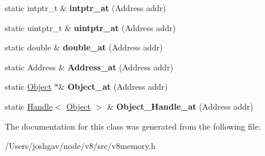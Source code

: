 \begin{DoxyCompactItemize}
\item 
static intptr\+\_\+t \& {\bfseries intptr\+\_\+at} (Address addr)\hypertarget{classv8_1_1internal_1_1_memory_ac630a62dd8be6165db3ada9770397953}{}\label{classv8_1_1internal_1_1_memory_ac630a62dd8be6165db3ada9770397953}

\item 
static uintptr\+\_\+t \& {\bfseries uintptr\+\_\+at} (Address addr)\hypertarget{classv8_1_1internal_1_1_memory_ae19c9eb8301d712ea2706f5e351d18f9}{}\label{classv8_1_1internal_1_1_memory_ae19c9eb8301d712ea2706f5e351d18f9}

\item 
static double \& {\bfseries double\+\_\+at} (Address addr)\hypertarget{classv8_1_1internal_1_1_memory_ae6df6e6ff180d5ca8d3b1e03c528a5a4}{}\label{classv8_1_1internal_1_1_memory_ae6df6e6ff180d5ca8d3b1e03c528a5a4}

\item 
static Address \& {\bfseries Address\+\_\+at} (Address addr)\hypertarget{classv8_1_1internal_1_1_memory_a4e3a386530c273fb87e684a6cfd65c19}{}\label{classv8_1_1internal_1_1_memory_a4e3a386530c273fb87e684a6cfd65c19}

\item 
static \hyperlink{classv8_1_1internal_1_1_object}{Object} $\ast$\& {\bfseries Object\+\_\+at} (Address addr)\hypertarget{classv8_1_1internal_1_1_memory_a44b9d30b0f35df05e29aca423839b4f5}{}\label{classv8_1_1internal_1_1_memory_a44b9d30b0f35df05e29aca423839b4f5}

\item 
static \hyperlink{classv8_1_1internal_1_1_handle}{Handle}$<$ \hyperlink{classv8_1_1internal_1_1_object}{Object} $>$ \& {\bfseries Object\+\_\+\+Handle\+\_\+at} (Address addr)\hypertarget{classv8_1_1internal_1_1_memory_a7bf33a8f563caacf69f741bbae4f74e9}{}\label{classv8_1_1internal_1_1_memory_a7bf33a8f563caacf69f741bbae4f74e9}

\end{DoxyCompactItemize}


The documentation for this class was generated from the following file\+:\begin{DoxyCompactItemize}
\item 
/\+Users/joshgav/node/v8/src/v8memory.\+h\end{DoxyCompactItemize}
